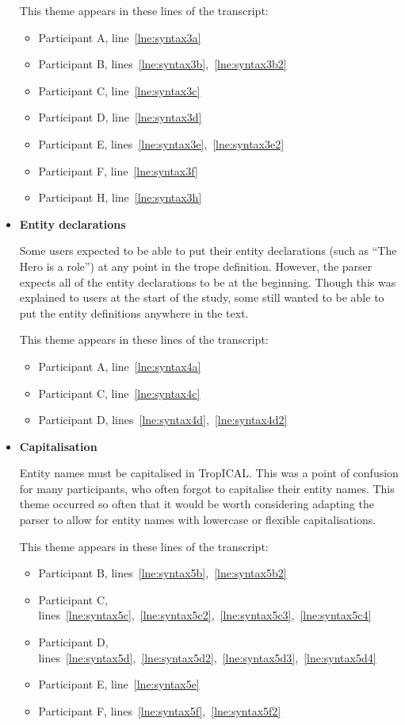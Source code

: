\documentclass[11pt]{report}
\newcommand{\lref}[1]{\hyperlink{llineno:#1}{\ref*{#1}}}
\begin{document}
\begin{itemize}
This theme appears in these lines of the transcript:

\begin{itemize}
\item Participant A, line~\lref{lne:syntax3a}
\item Participant B, lines~\lref{lne:syntax3b},~\lref{lne:syntax3b2}
\item Participant C, line~\lref{lne:syntax3c}
\item Participant D, line~\lref{lne:syntax3d}
\item Participant E, lines~\lref{lne:syntax3e},~\lref{lne:syntax3e2}
\item Participant F, line~\lref{lne:syntax3f}
\item Participant H, line~\lref{lne:syntax3h}
\end{itemize}

\item \textbf{Entity declarations}

Some users expected to be able to put their entity declarations (such as ``The
Hero is a role'') at any point in the trope definition. However, the parser
expects all of the entity declarations to be at the beginning. Though this was
explained to users at the start of the study, some still wanted to be able to
put the entity definitions anywhere in the text.

This theme appears in these lines of the transcript:

\begin{itemize}
\item Participant A, line~\lref{lne:syntax4a}
\item Participant C, line~\lref{lne:syntax4c}
\item Participant D, lines~\lref{lne:syntax4d},~\lref{lne:syntax4d2}
\end{itemize}
  
\item \textbf{Capitalisation}

Entity names must be capitalised in TropICAL. This was a point of confusion for
many participants, who often forgot to capitalise their entity names. This theme
occurred so often that it would be worth considering adapting the parser to
allow for entity names with lowercase or flexible capitalisations.

This theme appears in these lines of the transcript:

\begin{itemize}
\item Participant B, lines~\lref{lne:syntax5b},~\lref{lne:syntax5b2}
\item Participant C, lines~\lref{lne:syntax5c},~\lref{lne:syntax5c2},~\lref{lne:syntax5c3},~\lref{lne:syntax5c4}
\item Participant D, lines~\lref{lne:syntax5d},~\lref{lne:syntax5d2},~\lref{lne:syntax5d3},~\lref{lne:syntax5d4}
\item Participant E, line~\lref{lne:syntax5e}
\item Participant F, lines~\lref{lne:syntax5f},~\lref{lne:syntax5f2}
\end{itemize}
\end{itemize}
\end{document}
